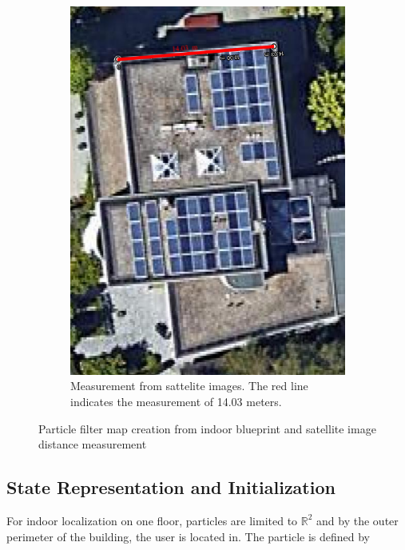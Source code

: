 \begin{figure}[H]
\begin{subfigure}[t]{.4\textwidth}
		\includegraphics[width=0.9\linewidth]{images/house_google_maps}
		\caption{ Measurement from sattelite images. The red line indicates the measurement of 14.03 meters.}
		\label{fig:house_google_maps}
	\end{subfigure} \quad
	\label{fig:particle_map_construction}
	\caption{Particle filter map creation from indoor blueprint and satellite image distance measurement}
\end{figure}

\subsection{State Representation and Initialization}
For indoor localization on one floor, particles are limited to $\mathbb{R}^{2}$ and by the outer perimeter of the building, the user is located in. The particle is defined by 

